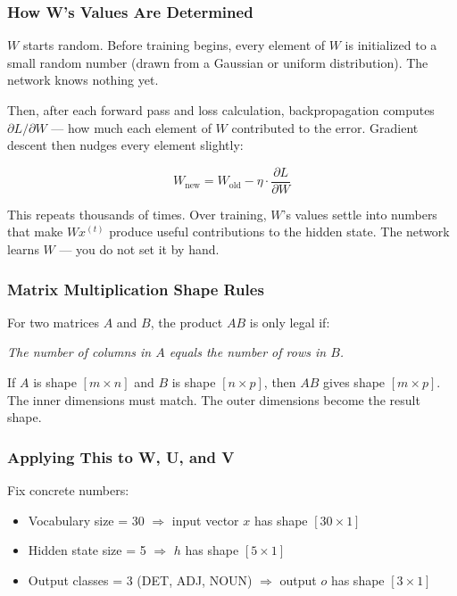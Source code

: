 \documentclass[12pt,a4paper]{article}
\begin{document}
\subsubsection{How W's Values Are Determined}

$W$ starts random. Before training begins, every element of $W$ is initialized to a small random number (drawn from a Gaussian or uniform distribution). The network knows nothing yet.

Then, after each forward pass and loss calculation, backpropagation computes $\partial L / \partial W$ --- how much each element of $W$ contributed to the error. Gradient descent then nudges every element slightly:

\[
W_{\text{new}} = W_{\text{old}} - \eta \cdot \frac{\partial L}{\partial W}
\]

This repeats thousands of times. Over training, $W$'s values settle into numbers that make $W x^{(t)}$ produce useful contributions to the hidden state. The network learns $W$ --- you do not set it by hand.

\subsubsection{Matrix Multiplication Shape Rules}

For two matrices $A$ and $B$, the product $AB$ is only legal if:

\begin{center}
\textit{The number of columns in $A$ equals the number of rows in $B$.}
\end{center}

If $A$ is shape $[m \times n]$ and $B$ is shape $[n \times p]$, then $AB$ gives shape $[m \times p]$. The inner dimensions must match. The outer dimensions become the result shape.

\subsubsection{Applying This to W, U, and V}

Fix concrete numbers:
\begin{itemize}
    \item Vocabulary size = 30 $\Rightarrow$ input vector $x$ has shape $[30 \times 1]$
    \item Hidden state size = 5 $\Rightarrow$ $h$ has shape $[5 \times 1]$
    \item Output classes = 3 (DET, ADJ, NOUN) $\Rightarrow$ output $o$ has shape $[3 \times 1]$
\end{itemize}
\end{document}
